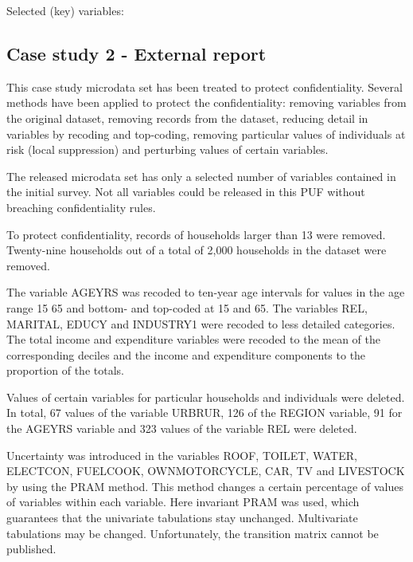 \documentclass[letterpaper,10pt,english]{sphinxmanual}
\begin{document}
Selected (key) variables:


\subsection{Case study 2 - External report}
\label{\detokenize{appendices:case-study-2-external-report}}
This case study microdata set has been treated to protect confidentiality. Several methods have been applied to protect the confidentiality: removing variables from the original dataset, removing records from the dataset, reducing detail in variables by recoding and top-coding, removing particular values of individuals at risk (local suppression) and perturbing values of certain variables.


The released microdata set has only a selected number of variables contained in the initial survey. Not all variables could be released in this PUF without breaching confidentiality rules.


To protect confidentiality, records of households larger than 13 were removed. Twenty-nine households out of a total of 2,000 households in the dataset were removed.


The variable AGEYRS was recoded to ten-year age intervals for values in the age range 15 \textendash{} 65 and bottom- and top-coded at 15 and 65. The variables REL, MARITAL, EDUCY and INDUSTRY1 were recoded to less detailed categories. The total income and expenditure variables were recoded to the mean of the corresponding deciles and the income and expenditure components to the proportion of the totals.


Values of certain variables for particular households and individuals were deleted. In total, 67 values of the variable URBRUR, 126 of the REGION variable, 91 for the AGEYRS variable and 323 values of the variable REL were deleted.


Uncertainty was introduced in the variables ROOF, TOILET, WATER, ELECTCON, FUELCOOK, OWNMOTORCYCLE, CAR, TV and LIVESTOCK by using the PRAM method. This method changes a certain percentage of values of variables within each variable. Here invariant PRAM was used, which guarantees that the univariate tabulations stay unchanged. Multivariate tabulations may be changed. Unfortunately, the transition matrix cannot be published.
\end{document}

